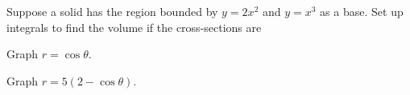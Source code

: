 \documentclass{exam}[12pt]
\begin{document}
\begin{questions}
{

\question Suppose a solid has the region bounded by $y=2x^2$ and $y=x^3$ as a base. Set up integrals to find the volume if the cross-sections are

\vspace{.3in}
\question Graph $r=\cos\theta$.

\vspace{.3in}
\question Graph $r=5(2-\cos\theta)$.

}
\end{questions}
\end{document}
